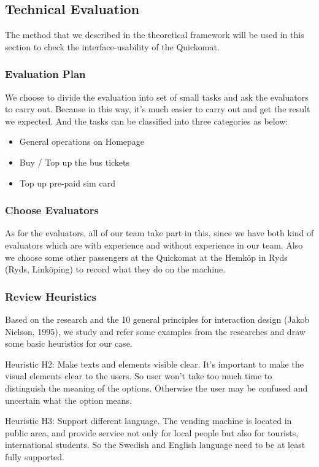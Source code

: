 \documentclass[twocolumn]{article}
\begin{document}
\subsection{Technical Evaluation}
The method that we described in the theoretical framework will be used in this section to check the interface-usability of the Quickomat.

\subsubsection{Evaluation Plan}
We choose to divide the evaluation into set of small tasks and ask the evaluators to carry out. Because in this way, it’s much easier to carry out and get the result we expected. And the tasks can be classified into three categories as below:
\begin{itemize}
  \item General operations on Homepage
  \item Buy / Top up the bus tickets
  \item Top up pre-paid sim card
\end{itemize}

\subsubsection{Choose Evaluators}
As for the evaluators, all of our team take part in this, since we have both kind of evaluators which are with experience and without experience in our team. Also we choose some other passengers at the Quickomat at the Hemköp in Ryds (Ryds, Linköping) to record what they do on the machine.

\subsubsection{Review Heuristics}
Based on the research and the 10 general principles for interaction design (Jakob Nielson, 1995), we study and refer some examples from the researches and draw some basic heuristics for our case.

Heuristic H2: Make texts and elements visible clear. It’s important to make the visual elements clear to the users. So user won’t take too much time to distinguish the meaning of the options. Otherwise the user may be confused and uncertain what the option means.

Heuristic H3: Support different language. The vending machine is located in public area, and provide service not only for local people but also for tourists, international students. So the Swedish and English language need to be at least fully supported.
\end{document}
